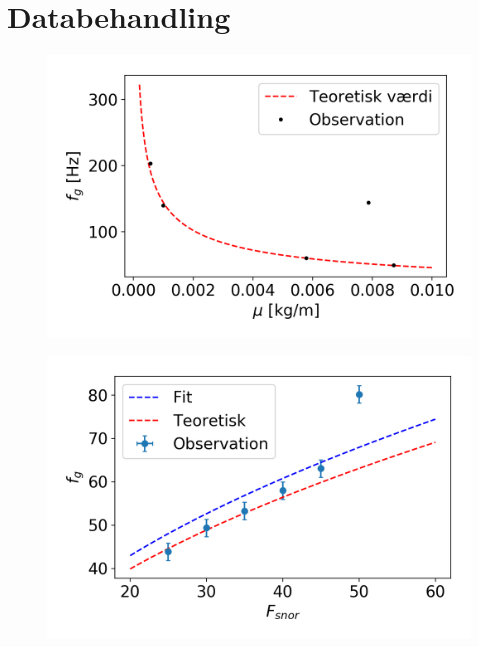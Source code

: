 \section{Databehandling}
\begin{figure}
    \includegraphics{frekvensMu.png}
    \caption{}
    \label{fig:frekvensMu}
\end{figure}

\begin{figure}
    \includegraphics{frekvensSnorSpaending.png}
    \caption{}
    \label{fig:frekvensSNor}
\end{figure}
